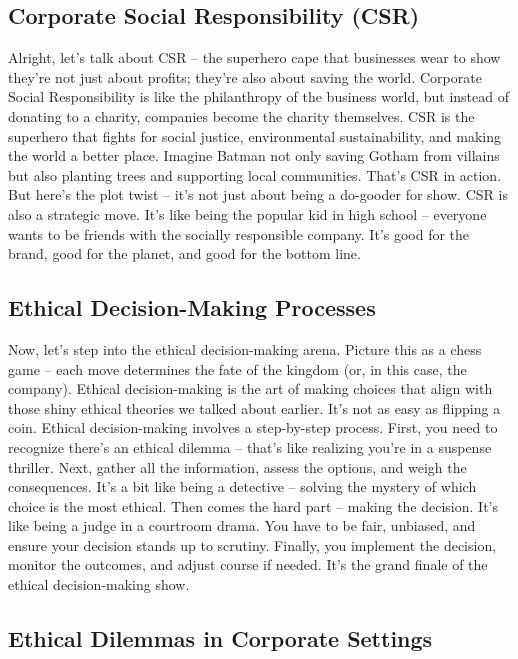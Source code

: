 \documentclass[
  letterpaper,
  DIV=11,
  numbers=noendperiod]{scrreprt}
\begin{document}
\subsection{Corporate Social Responsibility
(CSR)}\label{corporate-social-responsibility-csr}

Alright, let's talk about CSR -- the superhero cape that businesses wear
to show they're not just about profits; they're also about saving the
world. Corporate Social Responsibility is like the philanthropy of the
business world, but instead of donating to a charity, companies become
the charity themselves. CSR is the superhero that fights for social
justice, environmental sustainability, and making the world a better
place. Imagine Batman not only saving Gotham from villains but also
planting trees and supporting local communities. That's CSR in action.
But here's the plot twist -- it's not just about being a do-gooder for
show. CSR is also a strategic move. It's like being the popular kid in
high school -- everyone wants to be friends with the socially
responsible company. It's good for the brand, good for the planet, and
good for the bottom line.

\subsection{Ethical Decision-Making
Processes}\label{ethical-decision-making-processes}

Now, let's step into the ethical decision-making arena. Picture this as
a chess game -- each move determines the fate of the kingdom (or, in
this case, the company). Ethical decision-making is the art of making
choices that align with those shiny ethical theories we talked about
earlier. It's not as easy as flipping a coin. Ethical decision-making
involves a step-by-step process. First, you need to recognize there's an
ethical dilemma -- that's like realizing you're in a suspense thriller.
Next, gather all the information, assess the options, and weigh the
consequences. It's a bit like being a detective -- solving the mystery
of which choice is the most ethical. Then comes the hard part -- making
the decision. It's like being a judge in a courtroom drama. You have to
be fair, unbiased, and ensure your decision stands up to scrutiny.
Finally, you implement the decision, monitor the outcomes, and adjust
course if needed. It's the grand finale of the ethical decision-making
show.

\subsection{Ethical Dilemmas in Corporate
Settings}\label{ethical-dilemmas-in-corporate-settings}
\end{document}

